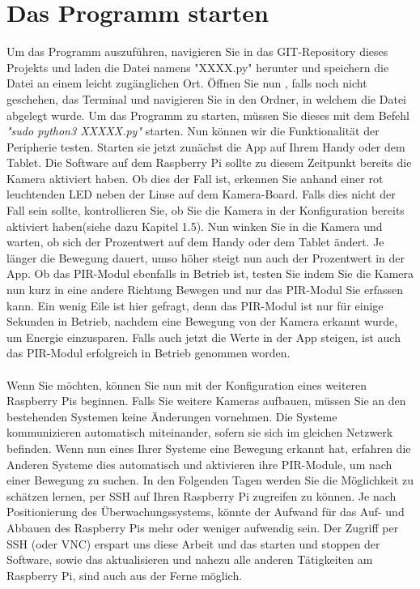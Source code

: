 \documentclass[12pt,a4paper]{scrreprt}
\begin{document}
\section{Das Programm starten}
Um das Programm auszuführen, navigieren Sie in das GIT-Repository dieses Projekts und laden die Datei namens "XXXX.py" herunter und speichern die Datei an einem leicht zugänglichen Ort. Öffnen Sie nun , falls noch nicht geschehen, das Terminal und navigieren Sie in den Ordner, in welchem die Datei abgelegt wurde. Um das Programm zu starten, müssen Sie dieses mit dem Befehl \textit{"sudo python3 XXXXX.py"} starten. Nun können wir die Funktionalität der Peripherie testen. Starten sie jetzt zunächst die App auf Ihrem Handy oder dem Tablet. Die Software auf dem Raspberry Pi sollte zu diesem Zeitpunkt bereits die Kamera aktiviert haben. Ob dies der Fall ist, erkennen Sie anhand einer rot leuchtenden LED neben der Linse auf dem Kamera-Board. Falls dies nicht der Fall sein sollte, kontrollieren Sie, ob Sie die Kamera in der Konfiguration bereits aktiviert haben(siehe dazu Kapitel 1.5). Nun winken Sie in die Kamera und warten, ob sich der Prozentwert auf dem Handy oder dem Tablet ändert. Je länger die Bewegung dauert, umso höher steigt nun auch der Prozentwert in der App. Ob das PIR-Modul ebenfalls in Betrieb ist, testen Sie indem Sie die Kamera nun kurz in eine andere Richtung Bewegen und nur das PIR-Modul Sie erfassen kann. Ein wenig Eile ist hier gefragt, denn das PIR-Modul ist nur für einige Sekunden in Betrieb, nachdem eine Bewegung von der Kamera erkannt wurde, um Energie einzusparen. Falls auch jetzt die Werte in der App steigen, ist auch das PIR-Modul erfolgreich in Betrieb genommen worden.\\ \\Wenn Sie möchten, können Sie nun mit der Konfiguration eines weiteren Raspberry Pis beginnen. Falls Sie weitere Kameras aufbauen, müssen Sie an den bestehenden Systemen keine Änderungen vornehmen. Die Systeme kommunizieren automatisch miteinander, sofern sie sich im gleichen Netzwerk befinden. Wenn nun eines Ihrer Systeme eine Bewegung erkannt hat, erfahren die Anderen Systeme dies automatisch und aktivieren ihre PIR-Module, um nach einer Bewegung zu suchen. In den Folgenden Tagen werden Sie die Möglichkeit zu schätzen lernen, per SSH auf Ihren Raspberry Pi zugreifen zu können. Je nach Positionierung des Überwachungssystems, könnte der Aufwand für das Auf- und Abbauen des Raspberry Pis mehr oder weniger aufwendig sein. Der Zugriff per SSH (oder VNC) erspart uns diese Arbeit und das starten und stoppen der Software, sowie das aktualisieren und nahezu alle anderen Tätigkeiten am Raspberry Pi, sind auch aus der Ferne möglich.
\end{document}
